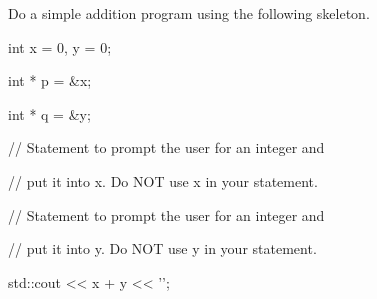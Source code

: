 Do a simple addition program using the following skeleton.

\begin{consolethree}[escapeinside=||]

int x = 0, y = 0;

int * p = &x;

int * q = &y;

// Statement to prompt the user for an integer and

// put it into x. Do NOT use x in your statement.



// Statement to prompt the user for an integer and

// put it into y. Do NOT use y in your statement.



std::cout << x + y << '\n';

\end{consolethree}

